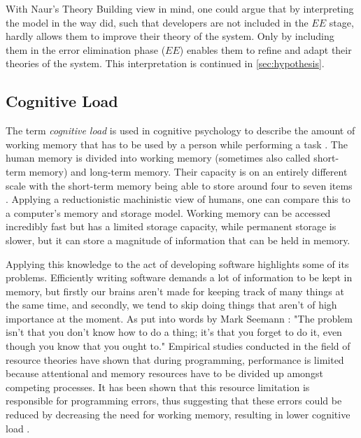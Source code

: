 With Naur's Theory Building view in mind, one could argue that by interpreting the model in the way \citeauthor{northover_agile_2007} did, such that developers are not included in the $EE$ stage, hardly allows them to improve their theory of the system.
Only by including them in the error elimination phase ($EE$) enables them to refine and adapt their theories of the system.
This interpretation is continued in \ref{sec:hypothesis}.


\subsection{Cognitive Load}
\label{sec:cognitive-load}
The term \emph{cognitive load} is used in cognitive psychology to describe the amount of working memory that has to be used by a person while performing a task \cite{shaw_memory_2016}.
The human memory is divided into working memory (sometimes also called short-term memory) and long-term memory.
Their capacity is on an entirely different scale \cite{seemann_code_2021} with the short-term memory being able to store around four to seven items \cite{shaw_memory_2016}.
Applying a reductionistic machinistic view of humans, one can compare this to a computer's memory and storage model.
Working memory can be accessed incredibly fast but has a limited storage capacity, while permanent storage is slower, but it can store a magnitude of information that can be held in memory.

Applying this knowledge to the act of developing software highlights some of its problems.
Efficiently writing software demands a lot of information to be kept in memory, but firstly our brains aren't made for keeping track of many things at the same time, and secondly, we tend to skip doing things that aren't of high importance at the moment.
As put into words by Mark Seemann \cite{seemann_code_2021}: "The problem isn't that you don't know how to do a thing; it's that you forget to do it, even though you know that you ought to."
Empirical studies conducted in the field of resource theories \cite{ormerod_human_1990} have shown that during programming, performance is limited because attentional and memory resources have to be divided up amongst competing processes.
It has been shown that this resource limitation is responsible for programming errors, thus suggesting that these errors could be reduced by decreasing the need for working memory, resulting in lower cognitive load \cite{ormerod_human_1990}.

